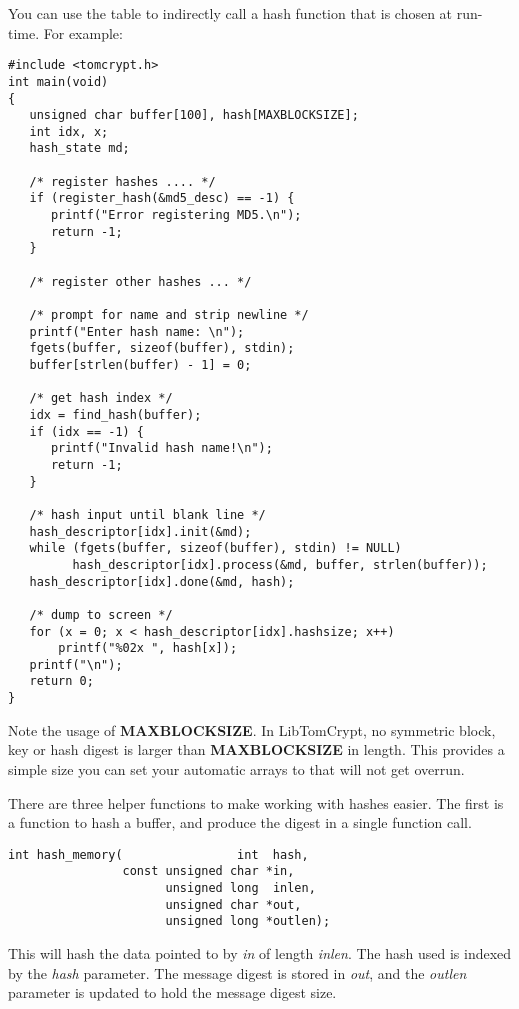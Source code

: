 \documentclass[synpaper]{book}
\begin{document}
You can use the table to indirectly call a hash function that is chosen at run-time.  For example:
\begin{small}
\begin{verbatim}
#include <tomcrypt.h>
int main(void)
{
   unsigned char buffer[100], hash[MAXBLOCKSIZE];
   int idx, x;
   hash_state md;

   /* register hashes .... */
   if (register_hash(&md5_desc) == -1) {
      printf("Error registering MD5.\n");
      return -1;
   }

   /* register other hashes ... */

   /* prompt for name and strip newline */
   printf("Enter hash name: \n");
   fgets(buffer, sizeof(buffer), stdin);
   buffer[strlen(buffer) - 1] = 0;

   /* get hash index */
   idx = find_hash(buffer);
   if (idx == -1) {
      printf("Invalid hash name!\n");
      return -1;
   }

   /* hash input until blank line */
   hash_descriptor[idx].init(&md);
   while (fgets(buffer, sizeof(buffer), stdin) != NULL)
         hash_descriptor[idx].process(&md, buffer, strlen(buffer));
   hash_descriptor[idx].done(&md, hash);

   /* dump to screen */
   for (x = 0; x < hash_descriptor[idx].hashsize; x++)
       printf("%02x ", hash[x]);
   printf("\n");
   return 0;
}
\end{verbatim}
\end{small}

Note the usage of \textbf{MAXBLOCKSIZE}.  In LibTomCrypt, no symmetric block, key or hash digest is larger than \textbf{MAXBLOCKSIZE} in
length.  This provides a simple size you can set your automatic arrays to that will not get overrun.

There are three helper functions to make working with hashes easier.  The first is a function to hash a buffer, and produce the digest in a single
function call.

\begin{verbatim}
int hash_memory(                int  hash,
                const unsigned char *in,
                      unsigned long  inlen,
                      unsigned char *out,
                      unsigned long *outlen);
\end{verbatim}

This will hash the data pointed to by \textit{in} of length \textit{inlen}.  The hash used is indexed by the \textit{hash} parameter.  The message
digest is stored in \textit{out}, and the \textit{outlen} parameter is updated to hold the message digest size.
\end{document}
